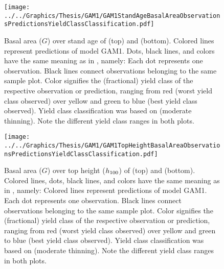 \begin{figure}[h]
  \centering
  \texttt{[image: ../../Graphics/Thesis/GAM1/GAM1StandAgeBasalAreaObservationsPredictionsYieldClassClassification.pdf]}
  \caption{Basal area (\(G\)) over stand age of \Beech{} (top) and \Spruce{} (bottom).  Colored lines represent predictions of model GAM1.  Dots, black lines, and colors have the same meaning as in , namely:  Each dot represents one observation.  Black lines connect observations belonging to the same sample plot.  Color signifies the (fractional) yield class of the respective observation or prediction, ranging from red (worst yield class observed) over yellow and green to blue (best yield class observed). Yield class classification was based on \textcite{Schober1995} (moderate thinning).  Note the different yield class ranges in both plots.}
  \label{fig:GAM1StandAgeBasalAreaObservationsPredictionsYieldClassClassification}
\end{figure}

\begin{figure}[h]
  \centering
  \texttt{[image: ../../Graphics/Thesis/GAM1/GAM1TopHeightBasalAreaObservationsPredictionsYieldClassClassification.pdf]}
  \caption{Basal area (\(G\)) over top height (\(h_{100}{}\)) of \Beech{} (top) and \Spruce{} (bottom).  Colored lines, dots, black lines, and colors have the same meaning as in , namely:  Colored lines represent predictions of model GAM1.  Each dot represents one observation.  Black lines connect observations belonging to the same sample plot.  Color signifies the (fractional) yield class of the respective observation or prediction, ranging from red (worst yield class observed) over yellow and green to blue (best yield class observed). Yield class classification was based on \textcite{Schober1995} (moderate thinning).  Note the different yield class ranges in both plots.}
  \label{fig:GAM1TopHeightBasalAreaObservationsPredictionsYieldClassClassification}
\end{figure}

\clearpage{}

